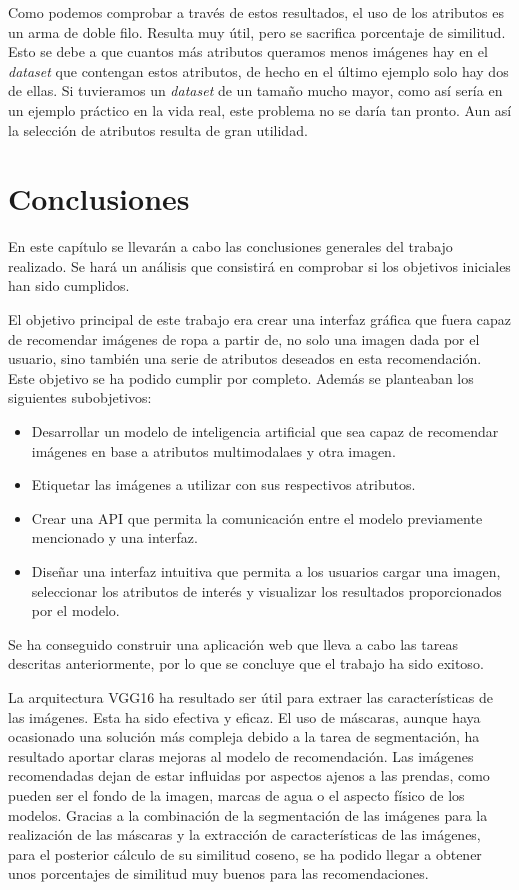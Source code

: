 \documentclass[12pt]{report} %
\begin{document}
	Como podemos comprobar a través de estos resultados, el uso de los atributos es un arma de doble filo. Resulta muy útil, pero se sacrifica porcentaje de similitud.
	Esto se debe a que cuantos más atributos queramos menos imágenes hay en el \textit{dataset} que contengan estos atributos, de hecho en el último ejemplo
	solo hay dos de ellas. Si tuvieramos un \textit{dataset} de un tamaño mucho mayor, como así sería en un ejemplo práctico en la vida real, este problema no se daría
	tan pronto. Aun así la selección de atributos resulta de gran utilidad.

	\chapter{Conclusiones}

	En este capítulo se llevarán a cabo las conclusiones generales del trabajo realizado.
	Se hará un análisis que consistirá en comprobar si los objetivos iniciales han sido cumplidos.

	El objetivo principal de este trabajo era crear una interfaz gráfica que fuera capaz de recomendar imágenes de ropa
	a partir de, no solo una imagen dada por el usuario, sino también una serie de atributos deseados en esta recomendación.
	Este objetivo se ha podido cumplir por completo. Además se planteaban los siguientes subobjetivos:
	\begin{itemize}
		\item Desarrollar un modelo de inteligencia artificial que sea capaz de recomendar imágenes en base a atributos multimodalaes y otra imagen.
		\item Etiquetar las imágenes a utilizar con sus respectivos atributos.
		\item Crear una API que permita la comunicación entre el modelo previamente mencionado y una interfaz.
		\item Diseñar una interfaz intuitiva que permita a los usuarios cargar una imagen, seleccionar los atributos de interés y visualizar los resultados proporcionados por el modelo.
	\end{itemize}
	Se ha conseguido construir una aplicación web que lleva a cabo las tareas descritas anteriormente, por lo que se concluye que el trabajo
	ha sido exitoso. 

	La arquitectura VGG16 ha resultado ser útil para extraer las características de las imágenes. Esta ha sido efectiva y eficaz.
	El uso de máscaras, aunque haya ocasionado una solución más compleja debido a la tarea de segmentación, ha resultado aportar
	claras mejoras al modelo de recomendación. Las imágenes recomendadas dejan de estar influidas por aspectos ajenos a las prendas,
	como pueden ser el fondo de la imagen, marcas de agua o el aspecto físico de los modelos. Gracias a la combinación de la segmentación
	de las imágenes para la realización de las máscaras y la extracción de características de las imágenes, para el posterior cálculo de
	su similitud coseno, se ha podido llegar a obtener unos porcentajes de similitud muy buenos para las recomendaciones.
\end{document}
